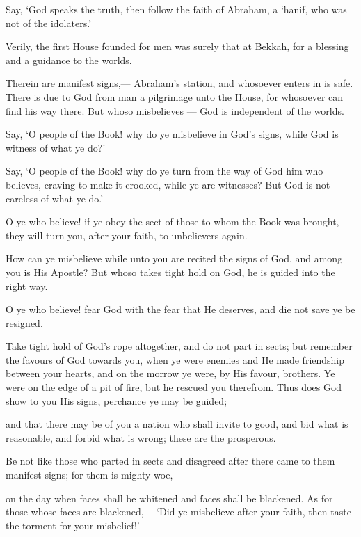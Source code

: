 \documentclass[fontsize=14pt, letterpaper, notitlepage, openany, DIV=12]{scrbook} %
\begin{document}
\noindent[3:95]
Say, `God speaks the truth, then follow the faith of Abraham, a `hanif, who was not of the
idolaters.'

\noindent[3:96]
Verily, the first House founded for men was surely that at Bekkah, for a blessing and a
guidance to the worlds.

\noindent[3:97]
Therein are manifest signs,--- Abraham's station, and whosoever enters in is safe. There
is due to God from man a pilgrimage unto the House, for whosoever can find his way there. But
whoso misbelieves --- God is independent of the worlds.

\noindent[3:98]
Say, `O people of the Book! why do ye misbelieve in God's signs, while God is witness
of what ye do?'

\noindent[3:99]
Say, `O people of the Book! why do ye turn from the way of God him who believes,
craving to make it crooked, while ye are witnesses? But God is not careless of what ye do.'

\noindent[3:100]
O ye who believe! if ye obey the sect of those to whom the Book was brought, they will
turn you, after your faith, to unbelievers again.

\noindent[3:101]
How can ye misbelieve while unto you are recited the signs of God, and among you is
His Apostle? But whoso takes tight hold on God, he is guided into the right way.

\noindent[3:102]
O ye who believe! fear God with the fear that He deserves, and die not save ye be
resigned.

\noindent[3:103]
Take tight hold of God's rope altogether, and do not part in sects; but remember the
favours of God towards you, when ye were enemies and He made friendship between your
hearts, and on the morrow ye were, by His favour, brothers. Ye were on the edge of a pit of fire,
but he rescued you therefrom. Thus does God show to you His signs, perchance ye may be
guided;

\noindent[3:104]
and that there may be of you a nation who shall invite to good, and bid what is
reasonable, and forbid what is wrong; these are the prosperous.

\noindent[3:105]
Be not like those who parted in sects and disagreed after there came to them manifest
signs; for them is mighty woe,

\noindent[3:106]
on the day when faces shall be whitened and faces shall be blackened. As for those whose
faces are blackened,--- `Did ye misbelieve after your faith, then taste the torment for your
misbelief!'
\end{document}
